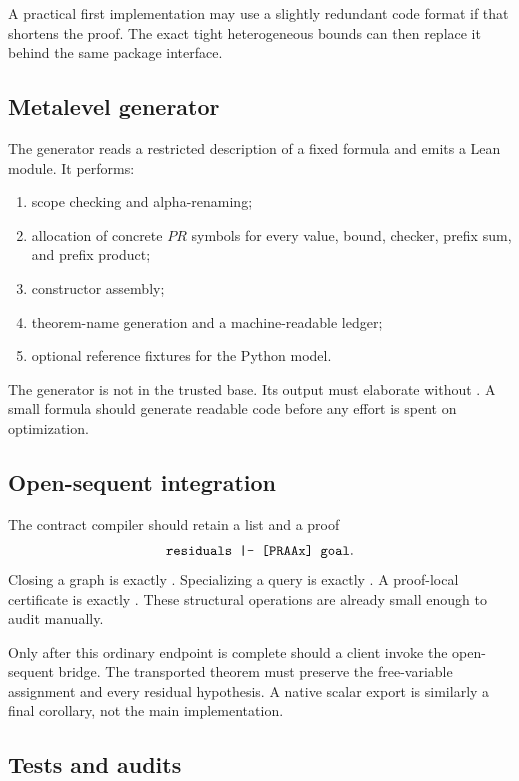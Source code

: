 A practical first implementation may use a slightly redundant code format if
that shortens the proof.  The exact tight heterogeneous bounds can then replace
it behind the same package interface.

\subsection{Metalevel generator}

The generator reads a restricted description of a fixed formula and emits a
Lean module.  It performs:

\begin{enumerate}
\item scope checking and alpha-renaming;
\item allocation of concrete \(PR\) symbols for every value, bound, checker,
prefix sum, and prefix product;
\item constructor assembly;
\item theorem-name generation and a machine-readable ledger;
\item optional reference fixtures for the Python model.
\end{enumerate}

The generator is not in the trusted base.  Its output must elaborate without
.  A small formula should generate readable code before any effort
is spent on optimization.

\subsection{Open-sequent integration}

The contract compiler should retain a list
 and a proof
\[
 \texttt{residuals |- [PRAAx] goal}.
\]
Closing a graph is exactly .  Specializing a query is
exactly .  A proof-local certificate is exactly
.  These structural operations are already
small enough to audit manually.

Only after this ordinary endpoint is complete should a client invoke the
open-sequent bridge.  The transported theorem must preserve the free-variable
assignment and every residual hypothesis.  A native scalar export is similarly
a final corollary, not the main implementation.

\subsection{Tests and audits}

